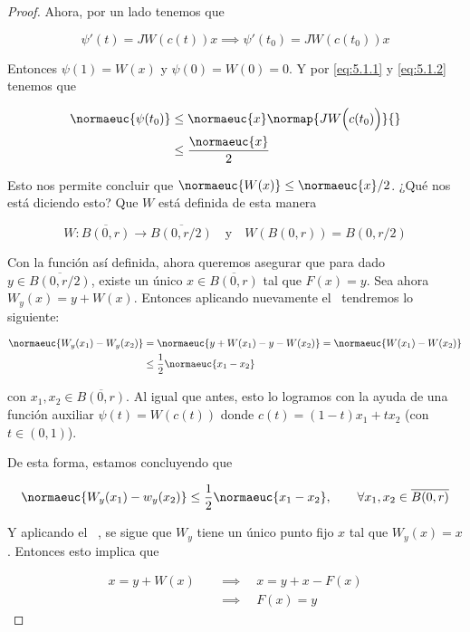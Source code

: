 \begin{proof}
    Ahora, por un lado tenemos que
    
    \[
    \psi'(t) = JW\left(c(t)\right)x \implies \psi'(t_0) = JW\left(c(t_0)\right)x
    \]
    
    Entonces $\psi(1) = W(x)$ y $\psi(0) = W(0) = 0$. Y por \ref{eq:5.1.1} y \ref{eq:5.1.2} tenemos que
    
    \begin{align*}
        \normaeuc{\psi(t_0)} &\leq \normaeuc{x}\normap{JW\Big( c(t_0) \Big)}{} \\
            &\leq \frac{\normaeuc{x}}{2}
    \end{align*}
    
    Esto nos permite concluir que $\normaeuc{W(x)} \leq \normaeuc{x}/2$. ¿Qué nos está diciendo esto? Que $W$ está definida de esta manera
    
    \[
    W: \overline{B(0,r)} \rightarrow \overline{B(0,r/2)} \quad \text{y} \quad W\left( B(0,r) \right) = B(0, r/2)
    \]
    
    Con la función así definida, ahora queremos asegurar que para dado $y \in \overline{B(0, r/2)}$, existe un único $x \in \overline{B(0,r)}$ tal que $F(x) = y$. Sea ahora $W_y(x) = y + W(x)$. Entonces aplicando nuevamente el \TVM~tendremos lo siguiente:
    
    \begin{align*}
        \normaeuc{W_y(x_1) - W_y(x_2)} &= \normaeuc{y + W(x_1) - y - W(x_2)} = \normaeuc{W(x_1) - W(x_2)} \\
            &\leq \frac{1}{2}\normaeuc{x_1 - x_2}
    \end{align*}
    
    \noindent con $x_1, x_2 \in \overline{B(0,r)}$. Al igual que antes, esto lo logramos con la ayuda de una función auxiliar $\psi(t) = W\left( c(t) \right)$ donde $c(t) = (1-t)x_1 + tx_2$ (con $t \in (0,1)$).
    
    De esta forma, estamos concluyendo que
    
    \[
    \normaeuc{W_y(x_1) - w_y(x_2)} \leq \frac{1}{2} \normaeuc{x_1 - x_2}, \qquad \forall x_1, x_2 \in \overline{B(0,r)}
    \]
    
    Y aplicando el \LC~, se sigue que $W_y$ tiene un único punto fijo $x$ tal que $W_y(x) = x$. Entonces esto implica que
    
    \begin{align*}
        x = y + W(x) \quad &\implies \quad x = y + x - F(x) \\
            &\implies \quad F(x) = y
    \end{align*}
    

\end{proof}
